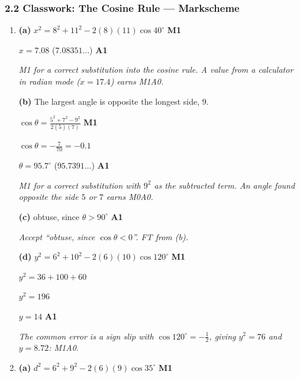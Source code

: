 \documentclass[12pt, twoside]{article}
\begin{document}
\subsubsection*{2.2 Classwork: The Cosine Rule --- Markscheme}

\begin{enumerate}[itemsep=0.3cm]

\item[1.] [Maximum mark: 7]

\textbf{(a)} $x^{2} = 8^{2} + 11^{2} - 2(8)(11)\cos 40^\circ$ \hfill \textbf{M1}

$x = 7.08$ \quad ($7.08351\ldots$) \hfill \textbf{A1}

\emph{M1 for a correct substitution into the cosine rule. A value from a
calculator in radian mode ($x = 17.4$) earns M1A0.}

\textbf{(b)} The largest angle is opposite the longest side, $9$.

$\cos\theta = \frac{5^{2} + 7^{2} - 9^{2}}{2(5)(7)}$ \hfill \textbf{M1}

$\cos\theta = -\frac{7}{70} = -0.1$

$\theta = 95.7^\circ$ \quad ($95.7391\ldots$) \hfill \textbf{A1}

\emph{M1 for a correct substitution with $9^{2}$ as the subtracted term. An
angle found opposite the side $5$ or $7$ earns M0A0.}

\textbf{(c)} obtuse, since $\theta > 90^\circ$ \hfill \textbf{A1}

\emph{Accept ``obtuse, since $\cos\theta < 0$''. FT from (b).}

\textbf{(d)} $y^{2} = 6^{2} + 10^{2} - 2(6)(10)\cos 120^\circ$ \hfill \textbf{M1}

$y^{2} = 36 + 100 + 60$

$y^{2} = 196$

$y = 14$ \hfill \textbf{A1}

\emph{The common error is a sign slip with $\cos 120^\circ = -\frac{1}{2}$,
giving $y^{2} = 76$ and $y = 8.72$: M1A0.}

\newpage

\item[2.] [Maximum mark: 6]

\textbf{(a)} $d^{2} = 6^{2} + 9^{2} - 2(6)(9)\cos 35^\circ$ \hfill \textbf{M1}


\end{enumerate}
\end{document}
